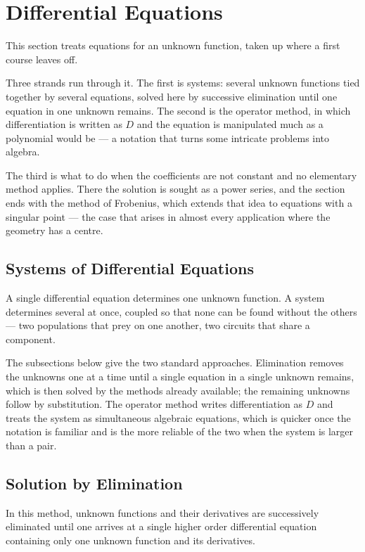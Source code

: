 \documentclass[11pt,a4paper]{article}
\theoremstyle{definition}
\begin{document}
{\color[wave]{485}\section{Differential Equations}}

This section treats equations for an unknown function, taken up where a first
course leaves off.

Three strands run through it. The first is systems: several unknown functions
tied together by several equations, solved here by successive elimination until
one equation in one unknown remains. The second is the operator method, in which
differentiation is written as $D$ and the equation is manipulated much as a
polynomial would be --- a notation that turns some intricate problems into
algebra.

The third is what to do when the coefficients are not constant and no elementary
method applies. There the solution is sought as a power series, and the section
ends with the method of Frobenius, which extends that idea to equations with a
singular point --- the case that arises in almost every application where the
geometry has a centre.


{\color[wave]{485}\subsection{Systems of Differential Equations}}

A single differential equation determines one unknown function. A system
determines several at once, coupled so that none can be found without the
others --- two populations that prey on one another, two circuits that share a
component.

The subsections below give the two standard approaches. Elimination removes the
unknowns one at a time until a single equation in a single unknown remains,
which is then solved by the methods already available; the remaining unknowns
follow by substitution. The operator method writes differentiation as $D$ and
treats the system as simultaneous algebraic equations, which is quicker once the
notation is familiar and is the more reliable of the two when the system is
larger than a pair.


{\color[wave]{485}\subsection{Solution by Elimination}}

In this method, unknown functions and their derivatives are successively eliminated until one arrives at a single higher order differential equation containing only one unknown function and its derivatives.
\end{document}
